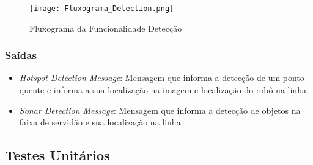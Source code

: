 \begin{figure}[!ht]
	\centering
	\texttt{[image: Fluxograma\_Detection.png]}
	\caption{Fluxograma da Funcionalidade Detecção} \label{FuncDetec}
\end{figure}

\subsubsection{Saídas}

\begin{itemize}
	\item \textit{Hotspot Detection Message}: Mensagem que informa a detecção de um ponto quente e informa a sua localização na imagem e localização do robô na linha.
	\item \textit{Sonar Detection Message}: Mensagem que informa a detecção de objetos na faixa de servidão e sua localização na linha.
\end{itemize}

\subsection{Testes Unitários}

